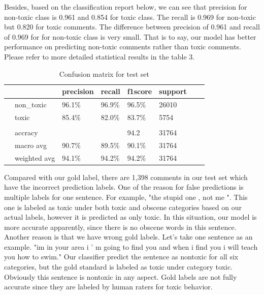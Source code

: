 \documentclass[sigconf]{acmart}
\begin{document}
Besides, based on the classification report below, we can see that precision for non-toxic class is 0.961 and 0.854 for toxic class. The recall is 0.969 for non-toxic but 0.820 for toxic comments. The difference between precision of 0.961 and recall of 0.969 for for non-toxic class is very small. That is to say, our model has better performance on predicting non-toxic comments rather than toxic comments. Please refer to more detailed statistical results in the table 3.

\begin{table}
	\caption {\label{tab:table3} Confusion matrix for test set} 
	\centering
	\begin{tabular}{llllllll}
		\hline
		&   & precision &  recall  & f1\-score & support \\
		\hline
		& non\_toxic & 96.1\% & 96.9\% & 96.5\% & 26010   \\
		& toxic & 85.4\% & 82.0\% & 83.7\% & 5754  \\
		\\
		& accracy &  &  & 94.2& 31764   \\
		& macro avg& 90.7\% & 89.5\% & 90.1\% & 31764   \\
		& weighted avg & 94.1\% & 94.2\% & 94.2\% & 31764   \\
		\hline
	\end{tabular}
\end{table}


Compared with our gold label, there are 1,398 comments in our test set which have the incorrect prediction labels. One of the reason for false predictions is multiple labels for one sentence. For example, "the stupid one , not me ". This one is labeled as toxic under both toxic and obscene categories based on our actual labels, however it is predicted as only toxic. In this situation, our model is more accurate apparently, since there is no obscene words in this sentence. Another reason is that we have wrong gold labels. Let's take one sentence as an example. "im in your area i ' m going to find you and when i find you i will teach you how to swim." Our classifier predict the sentence as nontoxic for all six categories, but the gold standard is labeled as toxic under category toxic. Obviously this sentence is nontoxic in any aspect. Gold labels are not fully accurate since they are labeled by human raters for toxic behavior.
\end{document}

